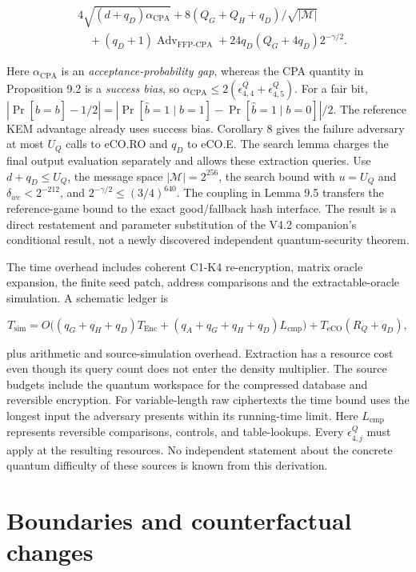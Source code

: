 \documentclass[
  11pt,
  a4paper,
  oneside]{report}
\begin{document}
\[
\begin{aligned}
&4\sqrt{(d+q_D)\alpha_{\mathrm{CPA}}}+
8(Q_G+Q_H+q_D)/\sqrt{|\mathcal M|}\\
&\quad +(q_D+1)\operatorname{Adv}_{\mathrm{FFP\text{-}CPA}}
+24q_D(Q_G+4q_D)2^{-\gamma/2}.
\end{aligned}
\]

Here \(\alpha_{\mathrm{CPA}}\) is an \emph{acceptance-probability gap},
whereas the CPA quantity in Proposition 9.2 is a \emph{success bias}, so
\(\alpha_{\mathrm{CPA}}\le2(\epsilon_{4,4}^Q+\epsilon_{4,5}^Q)\). For a
fair bit,
\(|\Pr[\hat b=b]-1/2|=|\Pr[\hat b=1\mid b=1]-\Pr[\hat b=1\mid b=0]|/2\).
The reference KEM advantage already uses success bias. Corollary 8 gives
the failure adversary at most \(U_Q\) calls to eCO.RO and \(q_D\) to
eCO.E. The search lemma charges the final output evaluation separately
and allows these extraction queries. Use \(d+q_D\le U_Q\), the message
space \(|\mathcal M|=2^{256}\), the search bound with \(u=U_Q\) and
\(\delta_{wc}<2^{-212}\), and \(2^{-\gamma/2}\le(3/4)^{640}\). The
coupling in Lemma 9.5 transfers the reference-game bound to the exact
good/fallback hash interface. The result is a direct restatement and
parameter substitution of the V4.2 companion's conditional result, not a
newly discovered independent quantum-security theorem.

The time overhead includes coherent C1-K4 re-encryption, matrix oracle
expansion, the finite seed patch, address comparisons and the
extractable-oracle simulation. A schematic ledger is

\[
T_{\mathrm{sim}}=O\big((q_G+q_H+q_D)T_{\mathrm{Enc}}+
(q_A+q_G+q_H+q_D)L_{\mathrm{cmp}}\big)
+T_{\mathrm{eCO}}(R_Q+q_D),
\]

plus arithmetic and source-simulation overhead. Extraction has a
resource cost even though its query count does not enter the density
multiplier. The source budgets include the quantum workspace for the
compressed database and reversible encryption. For variable-length raw
ciphertexts the time bound uses the longest input the adversary presents
within its running-time limit. Here \(L_{\mathrm{cmp}}\) represents
reversible comparisons, controls, and table-lookups. Every
\(\epsilon_{4,j}^Q\) must apply at the resulting resources. No
independent statement about the concrete quantum difficulty of these
sources is known from this derivation.

\section{Boundaries and counterfactual
changes}\label{boundaries-and-counterfactual-changes}
\end{document}
